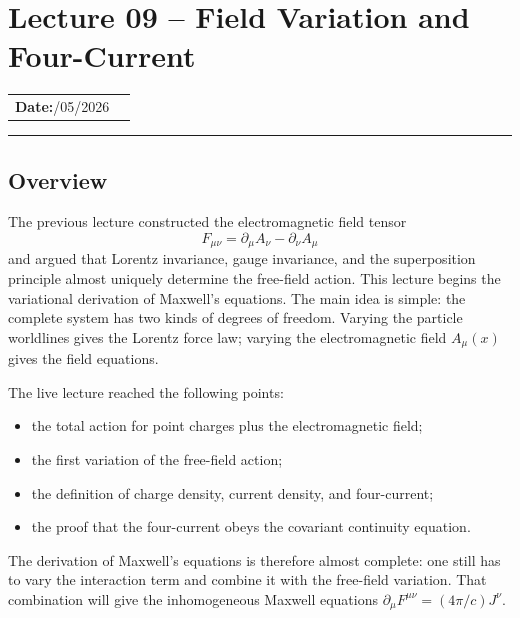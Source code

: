 \section{Lecture 09 -- Field Variation and Four-Current}\label{sec:lec09}

\begin{center}
\begin{tabular}{ll}
  \textbf{Date:}\quad 05/05/2026 & \\
\end{tabular}
\end{center}
\hrule\vspace{1.5em}

\subsection*{Overview}
The previous lecture constructed the electromagnetic field tensor
\begin{equation}\label{eq:lec09:F-def}
  F_{\mu\nu} = \partial_\mu A_\nu - \partial_\nu A_\mu
\end{equation}
and argued that Lorentz invariance, gauge invariance, and the superposition
principle almost uniquely determine the free-field action.  This lecture begins
the variational derivation of Maxwell's equations.  The main idea is simple:
the complete system has two kinds of degrees of freedom.  Varying the particle
worldlines gives the Lorentz force law; varying the electromagnetic field
$A_\mu(x)$ gives the field equations.

The live lecture reached the following points:
\begin{itemize}
  \item the total action for point charges plus the electromagnetic field;
  \item the first variation of the free-field action;
  \item the definition of charge density, current density, and four-current;
  \item the proof that the four-current obeys the covariant continuity equation.
\end{itemize}

The derivation of Maxwell's equations is therefore almost complete: one still
has to vary the interaction term and combine it with the free-field variation.
That combination will give the inhomogeneous Maxwell equations
$\partial_\mu F^{\mu\nu} = (4\pi/c)J^\nu$.

